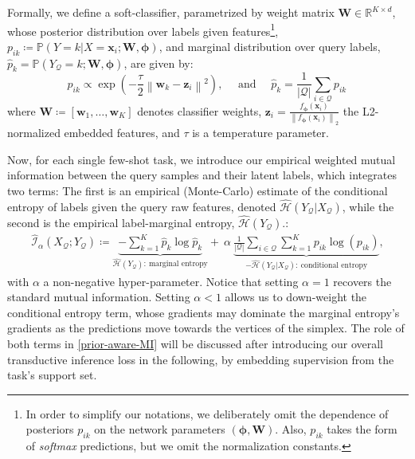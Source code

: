 \documentclass{article}
\newcommand{\x}{\bm{x}} \newcommand{\w}{\bm{w}} \newcommand{\p}{\bm{p}} \newcommand{\q}{\bm{q}} \newcommand{\cc}{\bm{c}} \newcommand{\y}{\bm{y}} \newcommand{\z}{\bm{z}} \newcommand{\Dcos}{D^{\text{cos}}}
\newcommand{\norm}[1]{\left\lVert#1\right\rVert}
\begin{document}
    	Formally, we define a soft-classifier, parametrized by weight matrix $\mathbf{W} \in \mathbb{R}^{K \times d}$, whose posterior distribution over labels given features\footnote{In order to simplify our  notations, we deliberately omit the dependence of posteriors $p_{ik}$ on the network parameters $(\boldsymbol{\phi},\mathbf{W})$. Also, $p_{ik}$ takes the form of \emph{softmax} predictions, but we omit the normalization constants.}, ${p_{ik} \coloneqq \mathbb{P}(Y=k|{ X=\x_i}; \mathbf{W}, \boldsymbol{\phi})}$, and marginal distribution over query labels, $\widehat{p}_k=\mathbb{P}(Y_\mathcal{Q}=k; \mathbf{W}, \bm{\phi})$, are given by:
    	\begin{equation}\label{eq:distance_based_classifier}
    		p_{ik} \propto \exp\left(-\frac{\tau}{2}\norm{\w_k - \z_i}^2\right),\quad  \textrm{ and } \quad   \widehat{p}_k = \frac{1}{|\mathcal{Q}|} \sum_{i \in \mathcal{Q}} p_{ik} \,  
    	\end{equation}
    	where $\mathbf{W} \coloneqq [\w_1, \dots, \w_K]$ denotes classifier weights, $\z_i=\frac{f_{\boldsymbol{\phi}}(\x_i)}{\norm{f_{\boldsymbol{\phi}}(\x_i)}_2}$ the L2-normalized embedded features, and $\tau$ is a temperature parameter. 
    
         Now, for each single few-shot task, we introduce our empirical weighted mutual information between the query samples and their latent labels, which integrates two terms: The first is an empirical (Monte-Carlo) estimate of the conditional entropy of labels given the query raw features, denoted $\mathcal{\widehat{H}}(Y_\mathcal{Q}|X_\mathcal{Q})$, while the second is the empirical label-marginal entropy, $\mathcal{\widehat{H}}(Y_\mathcal{Q})$.:
        \begin{align}
        \label{prior-aware-MI}
            \mathcal{\widehat{I}}_{\alpha}(X_\mathcal{Q}; Y_\mathcal{Q}) \coloneqq \underbrace{-\sum_{k=1}^K \widehat{p}_{k} \log \widehat{p}_{k}}_{\mathcal{\widehat{H}}(Y_\mathcal{Q}):~\text{marginal entropy}} +\ \alpha \ \underbrace{\frac{1}{|\mathcal{Q}|} \sum_{i \in \mathcal{Q}}\sum_{k=1}^K p_{ik} \log (p_{ik})}_{-\mathcal{\widehat{H}}(Y_\mathcal{Q}| X_\mathcal{Q}):~\text{conditional entropy}},
        \end{align}
        with $\alpha$ a non-negative hyper-parameter. Notice that setting $\alpha=1$ recovers the standard mutual information. Setting $\alpha<1$ allows us to down-weight the conditional entropy term, whose gradients may
        dominate the marginal entropy's gradients as the predictions move towards the vertices of the simplex. The role of both terms in \eqref{prior-aware-MI} will be discussed after introducing our overall transductive inference loss in the following, by embedding supervision from the task's support set. 
\end{document}
